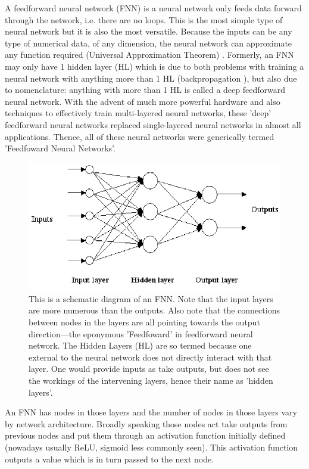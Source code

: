 \documentclass[a4paper,fleqn,usenatbib]{mnras}
\begin{document}
A feedforward neural network (FNN) is a neural network only feeds data forward through the network, i.e. there are no loops. This is the most simple type of neural network but it is also the most versatile. Because the inputs can be any type of numerical data, of any dimension, the neural network can approximate any function required (Universal Approximation Theorem) \citep{UniversalApproximationTheorem}. Formerly, an FNN may only have 1 hidden layer (HL) which is due to both problems with training a neural network with anything more than 1 HL (backpropagation \citep{Backpropagation}), but also due to nomenclature: anything with more than 1 HL is called a deep feedforward neural network. With the advent of much more powerful hardware and also techniques to effectively train multi-layered neural networks, these 'deep' feedforward neural networks replaced single-layered neural networks in almost all applications. Thence, all of these neural networks were generically termed 'Feedfoward Neural Networks'.  \citep{FNN}

\begin{figure}
\includegraphics[width=\columnwidth]{../Figures/FNN_Diagram}
\caption{This is a schematic diagram of an FNN. Note that the input layers are more numerous than the outputs. Also note that the connections between nodes in the layers are all pointing towards the output direction---the eponymous 'Feedfoward' in feedforward neural network. The Hidden Layers (HL) are so termed because one external to the neural network does not directly interact with that layer. One would provide inputs as take outputs, but does not see the workings of the intervening layers, hence their name as 'hidden layers'. \protect\citep{FNN} \label{fig:FNN_Diagram} }
\end{figure}

An FNN has nodes in those layers and the number of nodes in those layers vary by network architecture. Broadly speaking those nodes act take outputs from previous nodes and put them through an activation function initially defined (nowadays usually ReLU, sigmoid less commonly seen). This activation function outputs a value which is in turn passed to the next node.
\end{document}
